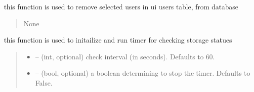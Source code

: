 \documentclass[letterpaper,10pt,english]{sphinxmanual}
\begin{document}
\begin{savenotes}
\begin{fulllineitems}
\begin{savenotes}
\begin{fulllineitems}
\end{fulllineitems}\end{savenotes}


\begin{savenotes}\begin{fulllineitems}
\label{\detokenize{setting/setting_api:oxin.setting_api.API.remove_users}}
\pysigstartsignatures
{}
\pysigstopsignatures
\sphinxAtStartPar
this function is used to remove selected users in ui users table, from database
\begin{quote}\begin{description}
\sphinxAtStartPar
None

\end{description}\end{quote}

\end{fulllineitems}\end{savenotes}


\begin{savenotes}\begin{fulllineitems}
\label{\detokenize{setting/setting_api:oxin.setting_api.API.run_storage_check_timer}}
\pysigstartsignatures
{}
\pysigstopsignatures
\sphinxAtStartPar
this function is used to initailize and run timer for checking storage statues
\begin{quote}\begin{description}
\begin{itemize}
\item {} 
\sphinxAtStartPar
{} – (int, optional) check interval (in seconds). Defaults to 60.

\item {} 
\sphinxAtStartPar
{} – (bool, optional) a boolean determining to stop the timer. Defaults to False.


\end{itemize}
\end{description}
\end{quote}
\end{fulllineitems}
\end{savenotes}
\end{fulllineitems}
\end{savenotes}
\end{document}
